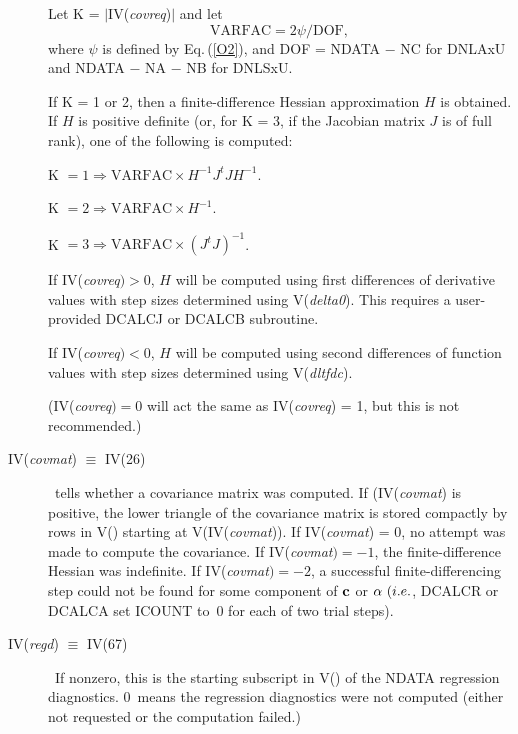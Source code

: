 \documentclass[twoside]{MATH77}
\begin{document}
\begin{description}
Let K = $|$IV({\em covreq})$|$ and let
\begin{equation*}
\text{VARFAC}=2\psi /\text{DOF},
\end{equation*}
where $\psi $ is defined by Eq.\,(\ref{O2}), and DOF = NDATA $-$ NC for
DNLAxU and NDATA $-$ NA $-$ NB for DNLSxU.

If K = 1 or 2, then a finite-difference Hessian approximation $H$ is obtained.
If $H$ is positive definite (or, for K = 3, if the Jacobian matrix $J$ is of
full rank), one of the following is computed:

K $=1\Rightarrow \text{VARFAC}\times H^{-1}J^tJH^{-1}.$

K $=2\Rightarrow \text{VARFAC}\times H^{-1}.$

K $=3\Rightarrow \text{VARFAC}\times (J^tJ)^{-1}$.

If IV({\em covreq}$)>0$, $H$ will be computed using first differences of derivative
values with step sizes determined using V({\em delta0}). This requires a
user-provided DCALCJ or DCALCB subroutine.

If IV({\em covreq}$)<0$, $H$ will be computed using second differences of function
values with step sizes determined using V({\em dltfdc}).

(IV({\em covreq}$)=0$ will act the same as IV({\em covreq}) = 1, but this is not
recommended.)

\item[IV({\em covmat}) $\equiv $ IV(26)]  \ tells whether a covariance matrix
was computed. If (IV({\em covmat}) is positive, the lower triangle of the
covariance matrix is stored compactly by rows in V() starting at
V(IV({\em covmat})). If IV({\em covmat}) = 0, no attempt was made to compute
the covariance. If IV({\em covmat}$)=-1$, the finite-difference Hessian was
indefinite. If IV({\em covmat}$)=-2$, a successful finite-differencing step
could not be found for some component of ${\bf c}$ or ${\bf \alpha }\ (i.e.$,
DCALCR or DCALCA set ICOUNT to~0 for each of two trial steps).

\item[IV({\em regd}) $\equiv $ IV(67)]  \ If nonzero, this is the starting
subscript in V() of the NDATA regression diagnostics. 0~means the
regression diagnostics were not computed (either not requested or the
computation failed.)
\end{description}
\end{document}
